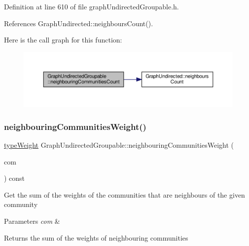 Definition at line 610 of file graph\+Undirected\+Groupable.\+h.



References Graph\+Undirected\+::neighbours\+Count().

Here is the call graph for this function\+:
\nopagebreak
\begin{figure}[H]
\begin{center}
\leavevmode
\includegraphics[width=350pt]{classGraphUndirectedGroupable_aaf488071a0e3b6cf96b29ae1af8df02f_cgraph}
\end{center}
\end{figure}
\mbox{\label{classGraphUndirectedGroupable_ae8d5d8cea2c1dfba0b4e7110100f2973}} 
\subsubsection{\texorpdfstring{neighbouring\+Communities\+Weight()}{neighbouringCommunitiesWeight()}}
{\footnotesize\ttfamily \hyperlink{edge_8h_a2e7ea3be891ac8b52f749ec73fee6dd2}{type\+Weight} Graph\+Undirected\+Groupable\+::neighbouring\+Communities\+Weight (\begin{DoxyParamCaption}\item[{const \hyperlink{graphUndirectedGroupable_8h_a914da95c9ea7f14f4b7f875c36818556}{type\+Community} \&}]{com }\end{DoxyParamCaption}) const\hspace{0.3cm}{\ttfamily [inline]}}

Get the sum of the weights of the communities that are neighbours of the given community


\begin{DoxyParams}{Parameters}
{\em com} & \\
\hline
\end{DoxyParams}
\begin{DoxyReturn}{Returns}
the sum of the weights of neighbouring communities 
\end{DoxyReturn}


